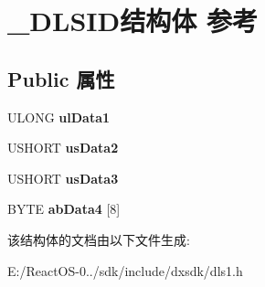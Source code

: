 \hypertarget{struct___d_l_s_i_d}{}\section{\+\_\+\+D\+L\+S\+I\+D结构体 参考}
\label{struct___d_l_s_i_d}
\subsection*{Public 属性}
\begin{DoxyCompactItemize}
\item 
\mbox{\label{struct___d_l_s_i_d_a095d1b7a1fe8aead925aeaa3364a53ef}} 
U\+L\+O\+NG {\bfseries ul\+Data1}
\item 
\mbox{\label{struct___d_l_s_i_d_a75eb3cee312733d75eb80af51e50a848}} 
U\+S\+H\+O\+RT {\bfseries us\+Data2}
\item 
\mbox{\label{struct___d_l_s_i_d_aa8847ab051399a6b18743ea884eef7b4}} 
U\+S\+H\+O\+RT {\bfseries us\+Data3}
\item 
\mbox{\label{struct___d_l_s_i_d_aa4da466831cacbae8856705ba79489af}} 
B\+Y\+TE {\bfseries ab\+Data4} \mbox{[}8\mbox{]}
\end{DoxyCompactItemize}


该结构体的文档由以下文件生成\+:\begin{DoxyCompactItemize}
\item 
E\+:/\+React\+O\+S-\/0../sdk/include/dxsdk/dls1.\+h\end{DoxyCompactItemize}
